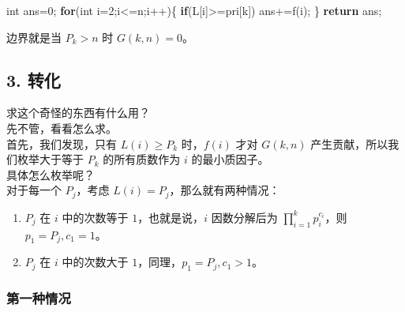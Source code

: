 \documentclass[
]{article}
\newenvironment{Shaded}{}{}
\newcommand{\ControlFlowTok}[1]{\textcolor[rgb]{0.00,0.44,0.13}{\textbf{#1}}}
\newcommand{\DataTypeTok}[1]{\textcolor[rgb]{0.56,0.13,0.00}{#1}}
\newcommand{\DecValTok}[1]{\textcolor[rgb]{0.25,0.63,0.44}{#1}}
\newcommand{\NormalTok}[1]{#1}
\newcommand{\OperatorTok}[1]{\textcolor[rgb]{0.40,0.40,0.40}{#1}}
\begin{document}
\begin{Shaded}
\begin{Highlighting}[]
\DataTypeTok{int}\NormalTok{ ans}\OperatorTok{=}\DecValTok{0}\OperatorTok{;}
\ControlFlowTok{for}\OperatorTok{(}\DataTypeTok{int}\NormalTok{ i}\OperatorTok{=}\DecValTok{2}\OperatorTok{;}\NormalTok{i}\OperatorTok{\textless{}=}\NormalTok{n}\OperatorTok{;}\NormalTok{i}\OperatorTok{++)\{}
		\ControlFlowTok{if}\OperatorTok{(}\NormalTok{L}\OperatorTok{[}\NormalTok{i}\OperatorTok{]\textgreater{}=}\NormalTok{pri}\OperatorTok{[}\NormalTok{k}\OperatorTok{])}\NormalTok{ ans}\OperatorTok{+=}\NormalTok{f}\OperatorTok{(}\NormalTok{i}\OperatorTok{);}
\OperatorTok{\}}
\ControlFlowTok{return}\NormalTok{ ans}\OperatorTok{;}
\end{Highlighting}
\end{Shaded}

边界就是当 \(P_k>n\) 时 \(G(k,n)=0\)。

\subsection{3. 转化}\label{3-ux8f6cux5316}

求这个奇怪的东西有什么用？\\
先不管，看看怎么求。\\
首先，我们发现，只有 \(L(i)\ge P_k\) 时，\(f(i)\) 才对 \(G(k,n)\)
产生贡献，所以我们枚举大于等于 \(P_k\) 的所有质数作为 \(i\)
的最小质因子。\\
具体怎么枚举呢？\\
对于每一个 \(P_j\)，考虑 \(L(i)=P_j\)，那么就有两种情况：

\begin{enumerate}
\def\labelenumi{\arabic{enumi}.}
\item
  \(P_j\) 在 \(i\) 中的次数等于 \(1\)，也就是说，\(i\) 因数分解后为
  \(\displaystyle\prod_{i=1}^k p_i^{c_i}\)，则 \(p_1=P_j,c_1=1\)。
\item
  \(P_j\) 在 \(i\) 中的次数大于 \(1\)，同理，\(p_1=P_j,c_1>1\)。
\end{enumerate}

\subsubsection{第一种情况}\label{ux7b2cux4e00ux79cdux60c5ux51b5}
\end{document}
